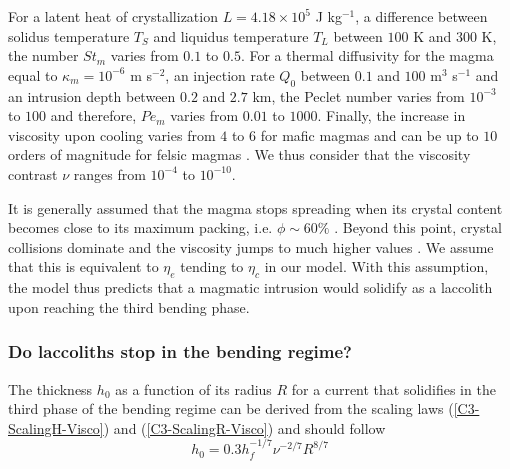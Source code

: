For a latent heat of crystallization $L = 4.18\times10^5$ J kg$^{-1}$,
a   difference  between   solidus  temperature   $T_S$  and   liquidus
temperature  $T_L$ between  $100$ K  and  $300$ K,  the number  $St_m$
varies from $0.1$  to $0.5$.  For a thermal diffusivity  for the magma
equal  to $\kappa_m=  10^{-6}$  m s$^{-2}$,  an  injection rate  $Q_0$
between $0.1$ and $100$ m$^3$  s$^{-1}$ and an intrusion depth between
$0.2$ and $2.7$  km, the Peclet number varies from  $10^{-3}$ to $100$
and  therefore, $Pe_m$  varies from  $0.01$ to  $1000$.  Finally,  the
increase in  viscosity upon cooling varies  from $4$ to $6$  for mafic
magmas and  can be up  to $10$ orders  of magnitude for  felsic magmas
\citep{Anonymous:CZVBrBvv,Lejeune:1995fc,Giordano:2008em,Diniega:2013eh}.
We  thus  consider  that  the viscosity  contrast  $\nu$  ranges  from
$10^{-4}$ to $10^{-10}$.

It  is generally  assumed  that  the magma  stops  spreading when  its
crystal   content  becomes   close  to   its  maximum   packing,  i.e.
$\phi \sim 60\%$ \citep{Pinkerton:1992fwa}.  Beyond this point, crystal
collisions  dominate and  the viscosity  jumps to  much higher  values
\citep{Lejeune:1995fc,Giordano:2008em}.   We   assume  that   this  is
equivalent to  $\eta_e$ tending to  $\eta_c$ in our model.   With this
assumption, the  model thus predicts  that a magmatic  intrusion would
solidify as a laccolith upon reaching the third bending phase.

\subsubsection*{Do laccoliths stop in the bending regime?}
\label{C4-sec:range-valu-dimens}

The thickness $h_0$ as a function of its radius $R$ for a current that
solidifies in  the third phase  of the  bending regime can  be derived
from     the     scaling    laws     (\ref{C3-ScalingH-Visco})     and
(\ref{C3-ScalingR-Visco}) and should follow
\begin{equation}
  h_0 = 0.3 h_f^{-1/7}\nu^{-2/7}R^{8/7}\label{C4-Hr}
\end{equation}

